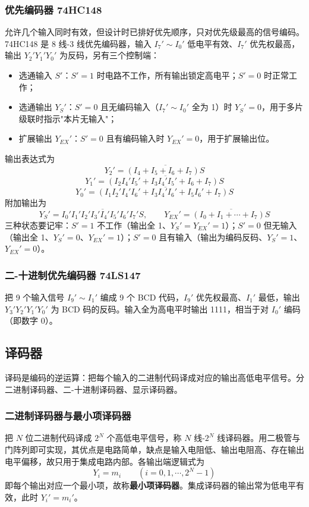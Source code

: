 \subsubsection{优先编码器 74HC148}
允许几个输入同时有效，但设计时已排好优先顺序，只对优先级最高的信号编码。74HC148 是 8 线-3 线优先编码器，输入 \(I_7'\sim I_0'\) 低电平有效、\(I_7'\) 优先权最高，输出 \(Y_2'Y_1'Y_0'\) 为反码，另有三个控制端：
\begin{itemize}
    \item 选通输入 \(S'\)：\(S'=1\) 时电路不工作，所有输出锁定高电平；\(S'=0\) 时正常工作；
    \item 选通输出 \(Y_S'\)：\(S'=0\) 且无编码输入（\(I_7'\sim I_0'\) 全为 1）时 \(Y_S'=0\)，用于多片级联时指示"本片无输入"；
    \item 扩展输出 \(Y_{EX}'\)：\(S'=0\) 且有编码输入时 \(Y_{EX}'=0\)，用于扩展输出位。
\end{itemize}
输出表达式为
\[
Y_2'=\overline{\left(I_4+I_5+I_6+I_7\right)S}
\]
\[
Y_1'=\overline{\left(I_2I_4'I_5'+I_3I_4'I_5'+I_6+I_7\right)S}
\]
\[
Y_0'=\overline{\left(I_1I_2'I_4'I_6'+I_3I_4'I_6'+I_5I_6'+I_7\right)S}
\]
附加输出为
\[
Y_S'=\overline{I_0'I_1'I_2'I_3'I_4'I_5'I_6'I_7'S},\qquad
Y_{EX}'=\overline{\left(I_0+I_1+\cdots+I_7\right)S}
\]
三种状态要记牢：\(S'=1\) 不工作（输出全 1、\(Y_S'=Y_{EX}'=1\)）；\(S'=0\) 但无输入（输出全 1、\(Y_S'=0\)、\(Y_{EX}'=1\)）；\(S'=0\) 且有输入（输出为编码反码、\(Y_S'=1\)、\(Y_{EX}'=0\)）。

\subsubsection{二-十进制优先编码器 74LS147}
把 9 个输入信号 \(I_9'\sim I_1'\) 编成 9 个 BCD 代码，\(I_9'\) 优先权最高、\(I_1'\) 最低，输出 \(Y_3'Y_2'Y_1'Y_0'\) 为 BCD 码的反码。输入全为高电平时输出 1111，相当于对 \(I_0'\) 编码（即数字 0）。

\subsection{译码器}
译码是编码的逆运算：把每个输入的二进制代码译成对应的输出高低电平信号。分二进制译码器、二-十进制译码器、显示译码器。

\subsubsection{二进制译码器与最小项译码器}
把 \(N\) 位二进制代码译成 \(2^N\) 个高低电平信号，称 \(N\) 线-\(2^N\) 线译码器。用二极管与门阵列即可实现，其优点是电路简单，缺点是输入电阻低、输出电阻高、存在输出电平偏移，故只用于集成电路内部。各输出端逻辑式为
\[
Y_i=m_i\qquad(i=0,1,\cdots,2^N-1)
\]
即每个输出对应一个最小项，故称\textbf{最小项译码器}。集成译码器的输出常为低电平有效，此时 \(Y_i'=m_i'\)。

